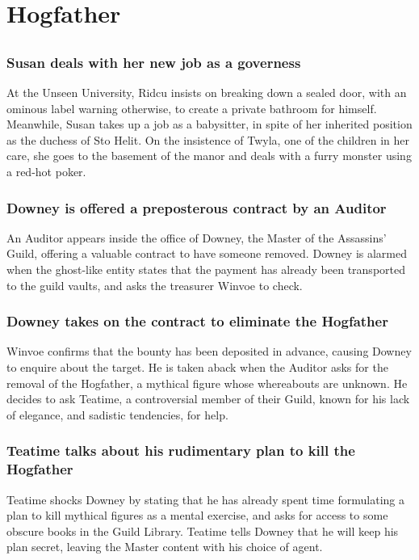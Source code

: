\section{Hogfather}


\subsection{}
\subsubsection{\Gls{Susan} deals with her new job as a governess}
At the Unseen University, \Gls{Ridcu} insists on breaking down a sealed door, with an ominous label
warning otherwise, to create a private bathroom for himself. Meanwhile, \Gls{Susan} takes up a job
as a babysitter, in spite of her inherited position as the duchess of Sto Helit. On the insistence
of \Gls{Twyla}, one of the children in her care, she goes to the basement of the manor and deals
with a furry monster using a red-hot poker.

\subsubsection{\Gls{Downey} is offered a preposterous contract by an Auditor}
An Auditor appears inside the office of \Gls{Downey}, the Master of the Assassins' Guild, offering a
valuable contract to have someone removed. \Gls{Downey} is alarmed when the ghost-like entity states
that the payment has already been transported to the guild vaults, and asks the treasurer
\Gls{Winvoe} to check.

\subsubsection{\Gls{Downey} takes on the contract to eliminate the Hogfather}
\Gls{Winvoe} confirms that the bounty has been deposited in advance, causing \Gls{Downey} to enquire
about the target. He is taken aback when the Auditor asks for the removal of the Hogfather, a
mythical figure whose whereabouts are unknown. He decides to ask \Gls{Teatime}, a controversial
member of their Guild, known for his lack of elegance, and sadistic tendencies, for help.

\subsubsection{\Gls{Teatime} talks about his rudimentary plan to kill the Hogfather}
\Gls{Teatime} shocks \Gls{Downey} by stating that he has already spent time formulating a plan to
kill mythical figures as a mental exercise, and asks for access to some obscure books in the Guild
Library. \Gls{Teatime} tells \Gls{Downey} that he will keep his plan secret, leaving the Master
content with his choice of agent.

